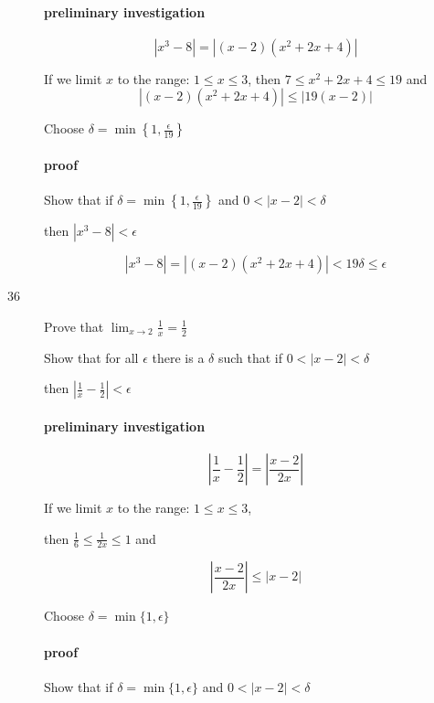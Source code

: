 \documentclass[letterpaper, landscape]{exam}
\begin{document}
\begin{description}
        \paragraph{preliminary investigation}

        \[
          | x^3 - 8 | = |(x - 2) \left(x^2 + 2x + 4\right) | 
        \]

        If we limit $x$ to the range: $1 \leq x \leq 3$, then $7 \leq x^2 + 2x + 4 \leq 19$ and
        \[
          |(x - 2) \left(x^2 + 2x + 4\right) | \leq |19 (x - 2)|
        \]

        Choose $\delta = \min \left\{1, \frac{\epsilon}{19} \right\}$

        \paragraph{proof}
        Show that if $\delta = \min \left\{ 1, \frac{\epsilon}{19} \right\}$ and 
        $0 < |x - 2| < \delta$ 
        
        then $| x^3 - 8 | < \epsilon$

        \[
          | x^3 - 8 | = |(x - 2) \left(x^2 + 2x + 4\right) | < 19 \delta \leq \epsilon
        \]

      \newpage

      \item[36] Prove that $\lim_{x \to 2} \frac{1}{x} = \frac{1}{2}$

        Show that for all $\epsilon$ there is a $\delta$ such that if 
        $0 < |x - 2| < \delta$ 
        
        then $\left| \frac{1}{x} - \frac{1}{2} \right| < \epsilon$

        \paragraph{preliminary investigation}

        \[
          \left| \frac{1}{x} - \frac{1}{2} \right| = \left| \frac{x - 2}{2x} \right| 
        \]

        If we limit $x$ to the range: $1 \leq x \leq 3$, 
        
        then $\frac{1}{6} \leq \frac{1}{2x} \leq 1$ and

        \[
          \left| \frac{x - 2}{2x} \right| \leq |x - 2|
        \]

        Choose $\delta = \min \{ 1, \epsilon \}$

        \paragraph{proof}
        Show that if $\delta = \min \{ 1, \epsilon \}$ and 
        $0 < |x - 2| < \delta$ 
        

\end{description}
\end{document}
